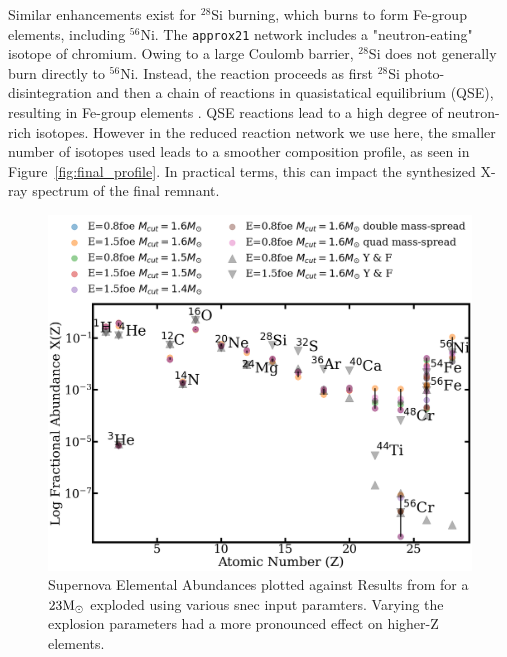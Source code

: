 \documentclass[twocolumn]{aastex631}
\begin{document}
Similar enhancements exist for $^{28}$Si burning, which burns to form Fe-group elements, including $^{56}$Ni. The \texttt{approx21} network includes a "neutron-eating" isotope of chromium. Owing to a large Coulomb barrier, $^{28}$Si does not generally burn directly to $^{56}$Ni. Instead, the reaction proceeds as first $^{28}$Si photo-disintegration and then a chain of reactions in quasistatical equilibrium (QSE), resulting in Fe-group elements \citep{hix96}. QSE reactions lead to a high degree of neutron-rich isotopes. However in the reduced reaction network we use here, the smaller number of isotopes used leads to a smoother composition profile, as seen in Figure~\ref{fig:final_profile}. In practical terms, this can impact the synthesized X-ray spectrum of the final remnant.

\begin{figure}[hbt!]
    \centering
    \includegraphics[scale=0.18]{23mabund.png}
    \caption{Supernova Elemental Abundances plotted against Results from \citet{YF07} for a $23 \rm M_{\odot}$ exploded using various snec input paramters. Varying the explosion parameters had a more pronounced effect on higher-Z elements.}
    \label{fig:23abund}
\end{figure}
\end{document}
